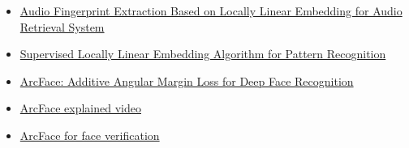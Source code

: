 \documentclass[a4paper, 12pt]{article}
\begin{document}
\begin{itemize}
    \item \href{https://www.researchgate.net/publication/344815452_Audio_Fingerprint_Extraction_Based_on_Locally_Linear_Embedding_for_Audio_Retrieval_System}{Audio Fingerprint Extraction Based on Locally Linear Embedding for Audio Retrieval System}
    \item \href{https://www.researchgate.net/publication/221258597_Supervised_Locally_Linear_Embedding_Algorithm_for_Pattern_Recognition}{Supervised Locally Linear Embedding Algorithm for Pattern Recognition}
    \item \href{https://arxiv.org/abs/1801.07698}{ArcFace: Additive Angular Margin Loss for Deep Face Recognition}
    \item \href{https://www.youtube.com/watch?v=H1qEp_czI1I&t=51s}{ArcFace explained video}
    \item \href{https://github.com/peteryuX/arcface-tf2}{ArcFace for face verification}
\end{itemize}
\end{document}
